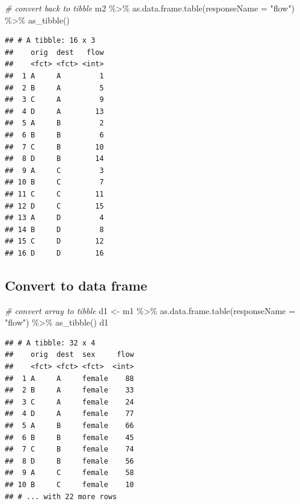 \documentclass[
]{book}
\newenvironment{Shaded}{\begin{snugshade}}{\end{snugshade}}
\newcommand{\AttributeTok}[1]{\textcolor[rgb]{0.77,0.63,0.00}{#1}}
\newcommand{\CommentTok}[1]{\textcolor[rgb]{0.56,0.35,0.01}{\textit{#1}}}
\newcommand{\FunctionTok}[1]{\textcolor[rgb]{0.00,0.00,0.00}{#1}}
\newcommand{\NormalTok}[1]{#1}
\newcommand{\OtherTok}[1]{\textcolor[rgb]{0.56,0.35,0.01}{#1}}
\newcommand{\SpecialCharTok}[1]{\textcolor[rgb]{0.00,0.00,0.00}{#1}}
\newcommand{\StringTok}[1]{\textcolor[rgb]{0.31,0.60,0.02}{#1}}
\begin{document}
\begin{Shaded}
\begin{Highlighting}[]
\CommentTok{\# convert back to tibble}
\NormalTok{m2 }\SpecialCharTok{\%\textgreater{}\%}
  \FunctionTok{as.data.frame.table}\NormalTok{(}\AttributeTok{responseName =} \StringTok{"flow"}\NormalTok{) }\SpecialCharTok{\%\textgreater{}\%}
  \FunctionTok{as\_tibble}\NormalTok{()}
\end{Highlighting}
\end{Shaded}

\begin{verbatim}
## # A tibble: 16 x 3
##    orig  dest   flow
##    <fct> <fct> <int>
##  1 A     A         1
##  2 B     A         5
##  3 C     A         9
##  4 D     A        13
##  5 A     B         2
##  6 B     B         6
##  7 C     B        10
##  8 D     B        14
##  9 A     C         3
## 10 B     C         7
## 11 C     C        11
## 12 D     C        15
## 13 A     D         4
## 14 B     D         8
## 15 C     D        12
## 16 D     D        16
\end{verbatim}

\hypertarget{convert-to-data-frame-1}{%
\subsection{Convert to data frame}\label{convert-to-data-frame-1}}

\begin{Shaded}
\begin{Highlighting}[]
\CommentTok{\# convert array to tibble}
\NormalTok{d1 }\OtherTok{\textless{}{-}}\NormalTok{ m1 }\SpecialCharTok{\%\textgreater{}\%}
  \FunctionTok{as.data.frame.table}\NormalTok{(}\AttributeTok{responseName =} \StringTok{"flow"}\NormalTok{) }\SpecialCharTok{\%\textgreater{}\%}
  \FunctionTok{as\_tibble}\NormalTok{()}
\NormalTok{d1}
\end{Highlighting}
\end{Shaded}

\begin{verbatim}
## # A tibble: 32 x 4
##    orig  dest  sex     flow
##    <fct> <fct> <fct>  <int>
##  1 A     A     female    88
##  2 B     A     female    33
##  3 C     A     female    24
##  4 D     A     female    77
##  5 A     B     female    66
##  6 B     B     female    45
##  7 C     B     female    74
##  8 D     B     female    56
##  9 A     C     female    58
## 10 B     C     female    10
## # ... with 22 more rows
\end{verbatim}
\end{document}
